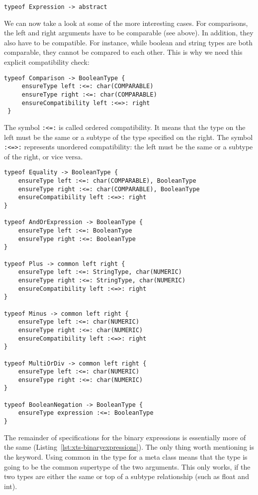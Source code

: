 \begin{lstlisting}[language=xts]
typeof Expression -> abstract
\end{lstlisting}

We can now take a look at some of the more interesting cases. For comparisons,
the left and right arguments  have to be comparable (see above). In addition,
they also have to be compatible. For instance, while boolean and string types
are both comparable, they cannot be compared to each other. This is why we need
this explicit compatibility check:

\begin{lstlisting}[language=xts]
 typeof Comparison -> BooleanType {
     ensureType left :<=: char(COMPARABLE)
     ensureType right :<=: char(COMPARABLE)
     ensureCompatibility left :<=>: right
 } 
\end{lstlisting}


The symbol \verb|:<=:| is called ordered compatibility. It
means that the type on the left must be the same or a subtype of the type
specified on the right. The symbol \verb|:<=>:| represents unordered
compatibility: the left must be the same or a subtype of the right, or vice
versa.

\begin{lstlisting}[language=xts,float,label=lst:xts-binaryexpressions,caption=Some
rules for expressions.] 
typeof Equality -> BooleanType {
    ensureType left :<=: char(COMPARABLE), BooleanType
    ensureType right :<=: char(COMPARABLE), BooleanType
    ensureCompatibility left :<=>: right
}

typeof AndOrExpression -> BooleanType {
    ensureType left :<=: BooleanType
    ensureType right :<=: BooleanType 
}   

typeof Plus -> common left right {
    ensureType left :<=: StringType, char(NUMERIC)
    ensureType right :<=: StringType, char(NUMERIC)
    ensureCompatibility left :<=>: right
} 

typeof Minus -> common left right {
    ensureType left :<=: char(NUMERIC)
    ensureType right :<=: char(NUMERIC)
    ensureCompatibility left :<=>: right
} 

typeof MultiOrDiv -> common left right { 
    ensureType left :<=: char(NUMERIC)
    ensureType right :<=: char(NUMERIC)
} 

typeof BooleanNegation -> BooleanType {
    ensureType expression :<=: BooleanType
}
\end{lstlisting}

The remainder of specifications for the binary expressions is essentially more
of the same (Listing~\ref{lst:xts-binaryexpressions}).
The only thing worth mentioning is the  keyword. Using common in the
type for a meta class means that the type is going to be the common supertype of the two
arguments. This only works, if the two types are either the same or top of a
subtype relationship (such as float and int).

